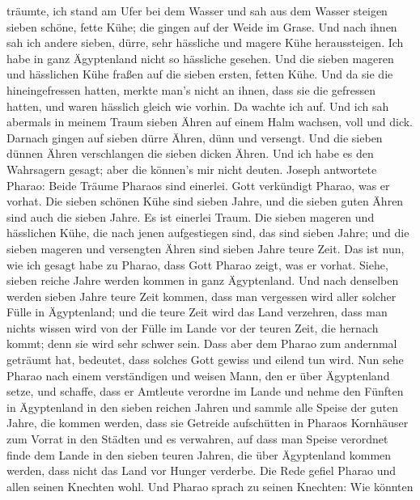 träumte, ich stand am Ufer bei dem Wasser  und sah aus dem
Wasser steigen sieben schöne, fette Kühe; die gingen auf der Weide im
Grase.  Und nach ihnen sah ich andere sieben, dürre, sehr
hässliche und magere Kühe heraussteigen. Ich habe in ganz Ägyptenland
nicht so hässliche gesehen.  Und die sieben mageren und
hässlichen Kühe fraßen auf die sieben ersten, fetten Kühe. 
Und da sie die hineingefressen hatten, merkte man's nicht an ihnen, dass
sie die gefressen hatten, und waren hässlich gleich wie vorhin. Da
wachte ich auf.  Und ich sah abermals in meinem Traum
sieben Ähren auf einem Halm wachsen, voll und dick. 
Darnach gingen auf sieben dürre Ähren, dünn und versengt. 
Und die sieben dünnen Ähren verschlangen die sieben dicken Ähren. Und
ich habe es den Wahrsagern gesagt; aber die können's mir nicht deuten.
 Joseph antwortete Pharao: Beide Träume Pharaos sind
einerlei. Gott verkündigt Pharao, was er vorhat.  Die
sieben schönen Kühe sind sieben Jahre, und die sieben guten Ähren sind
auch die sieben Jahre. Es ist einerlei Traum.  Die sieben
mageren und hässlichen Kühe, die nach jenen aufgestiegen sind, das sind
sieben Jahre; und die sieben mageren und versengten Ähren sind sieben
Jahre teure Zeit.  Das ist nun, wie ich gesagt habe zu
Pharao, dass Gott Pharao zeigt, was er vorhat.  Siehe,
sieben reiche Jahre werden kommen in ganz Ägyptenland.  Und
nach denselben werden sieben Jahre teure Zeit kommen, dass man vergessen
wird aller solcher Fülle in Ägyptenland; und die teure Zeit wird das
Land verzehren,  dass man nichts wissen wird von der Fülle
im Lande vor der teuren Zeit, die hernach kommt; denn sie wird sehr
schwer sein.  Dass aber dem Pharao zum andernmal geträumt
hat, bedeutet, dass solches Gott gewiss und eilend tun wird.
 Nun sehe Pharao nach einem verständigen und weisen Mann,
den er über Ägyptenland setze,  und schaffe, dass er
Amtleute verordne im Lande und nehme den Fünften in Ägyptenland in den
sieben reichen Jahren  und sammle alle Speise der guten
Jahre, die kommen werden, dass sie Getreide aufschütten in Pharaos
Kornhäuser zum Vorrat in den Städten und es verwahren,  auf
dass man Speise verordnet finde dem Lande in den sieben teuren Jahren,
die über Ägyptenland kommen werden, dass nicht das Land vor Hunger
verderbe.  Die Rede gefiel Pharao und allen seinen Knechten
wohl.  Und Pharao sprach zu seinen Knechten: Wie könnten
